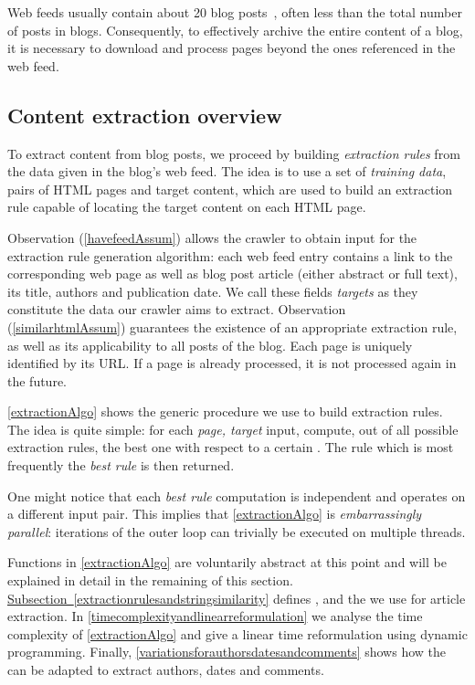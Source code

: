 Web feeds usually contain about 20 blog posts~\cite{oita2010}, 
often less than the total number of posts in blogs. Consequently, to 
effectively archive the entire content of a blog, it is necessary to 
download and process pages beyond the ones referenced in the web feed.

\subsection{Content extraction overview}
\label{contentextraction}

To extract content from blog posts, we proceed by building 
\emph{extraction rules} from the data given in the blog's web feed. 
The idea is to use a set of \emph{training data}, pairs of HTML pages 
and target content, which are used to build an extraction rule capable 
of locating the target content on each HTML page.

Observation (\ref{havefeedAssum}) allows the crawler to obtain input for 
the extraction rule generation algorithm: each web feed entry contains a 
link to the corresponding web page as well as blog post article (either 
abstract or full text), its title, authors and publication date. We call 
these fields \emph{targets} as they constitute the data our crawler aims 
to extract. Observation (\ref{similarhtmlAssum}) guarantees the existence 
of an appropriate extraction rule, as well as its applicability to all 
posts of the blog. Each page is uniquely identified by its URL. If a page is already processed, it is not processed again in the future.

\autoref{extractionAlgo} shows the generic procedure we use to build 
extraction rules. The idea is quite simple: for each \code{(}\emph{page, 
target}\code{)} input, compute, out of all possible extraction rules, 
the best one with respect to a certain . The rule 
which is most frequently the \emph{best rule} is then returned.

\extractionAlgo

One might notice that each \emph{best rule} computation is 
independent and operates on a different input pair. This implies that 
\autoref{extractionAlgo} is \emph{embarrassingly parallel}: iterations 
of the outer loop can trivially be executed on multiple threads.

Functions in \autoref{extractionAlgo} are voluntarily abstract at this 
point and will be explained in detail in the remaining of this section.
\hyperref[extractionrulesandstringsimilarity]{Subsection~\ref*{extractionrulesandstringsimilarity}} %
defines ,  and the  we use 
for article extraction. In \autoref{timecomplexityandlinearreformulation} 
we analyse the time complexity of \autoref{extractionAlgo} and give a 
linear time reformulation using dynamic programming. Finally, 
\autoref{variationsforauthorsdatesandcomments} shows how the 
 can be adapted to extract authors, dates and 
comments.

